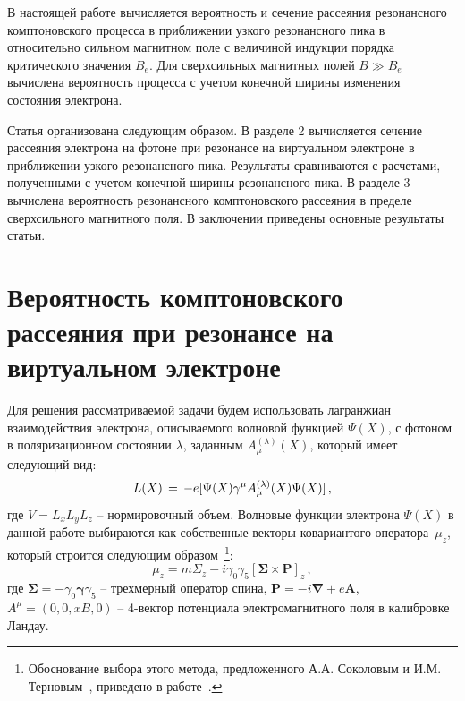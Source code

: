 \documentclass[cp1251%
               ]{jetp} %
\let\vec=\mathbf
\newcommand{\bs}{\boldsymbol}
\begin{document}
В настоящей работе вычисляется вероятность и сечение рассеяния резонансного комптоновского процесса в приближении узкого резонансного пика в относительно сильном магнитном поле с величиной индукции порядка критического значения $B_e$. Для сверхсильных магнитных полей $B \gg B_e$ вычислена вероятность процесса с учетом конечной ширины изменения состояния электрона.

Статья организована следующим образом. В разделе 2 вычисляется сечение рассеяния электрона на фотоне при резонансе на виртуальном электроне в приближении узкого резонансного пика. Результаты сравниваются с расчетами, полученными с учетом конечной ширины резонансного пика. В разделе 3 вычислена вероятность резонансного комптоновского рассеяния в пределе сверхсильного магнитного поля. В заключении приведены основные результаты статьи.





\section{Вероятность комптоновского рассеяния при резонансе на виртуальном электроне}

Для решения рассматриваемой задачи будем использовать лагранжиан взаимодействия электрона, описываемого волновой функцией $\Psi (X)$, с фотоном в поляризационном состоянии $\lambda$, заданным $A^{(\lambda)}_\mu (X)$,  который имеет следующий вид:
%
\begin{equation}\label{eq:L}
	{\cal L}(X) \, = \,- e [\bar \Psi (X) \gamma^{\mu} A^{(\lambda)}_\mu (X) 
	\Psi(X)] \, ,
\end{equation}
%
\noindent где $V = L_x L_y L_z$ -- нормировочный объем. Волновые функции электрона $\Psi (X)$ в данной работе выбираются как собственные векторы ковариантого оператора~$\mu_z$, который строится следующим образом~\footnote{Обоснование выбора этого метода, предложенного А.А. Соколовым и И.М. Терновым~\cite{Sokolov:1968}, приведено в работе~\cite{Rumyantsev:2017}.}: 
\begin{equation}\label{eq:muz}
	\mu_z=m \Sigma_z - i \gamma_0\gamma_5\left[\vec{\Sigma}\times 
	\vec{P}\right]_z\, ,
\end{equation}
%
\noindent где $\bs\Sigma = - \gamma_0 \bs\gamma \gamma_5$ -- трехмерный оператор спина, $\vec{P} = -i \vec{\nabla} +e \vec{A}$, $A^\mu=\left(0,0,xB,0\right)$ -- 4-вектор потенциала электромагнитного поля в калибровке Ландау.
\end{document}
